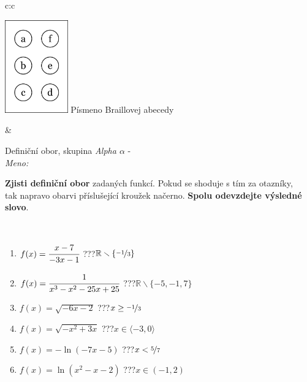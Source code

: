 \documentclass[10pt]{report}
\begin{document}
\begin{tabular}{c:c}
\begin{minipage}[c][104.5mm][t]{0.5\linewidth}
\begin{center}
\begin{minipage}{0.20\linewidth}
\begin{center}
\includegraphics[height=40mm]{../images/braille.png}
{\small Písmeno Braillovej abecedy}
\end{center}
\end{minipage}
\end{center}
\end{minipage}
&
\begin{minipage}[c][104.5mm][t]{0.5\linewidth}
\begin{center}
\vspace{7mm}
{\huge Definiční obor, skupina \textit{Alpha $\alpha$} -}\\[5mm]
\textit{Meno:}\phantom{xxxxxxxxxxxxxxxxxxxxxxxxxxxxxxxxxxxxxxxxxxxxxxxxxxxxxxxxxxxxxxxxx}\\[5mm]
\begin{minipage}{0.95\linewidth}
\textbf{Zjisti definiční obor} zadaných funkcí. Pokud se shoduje s tím za otazníky,\\tak napravo obarvi příslušející kroužek načerno. \textbf{Spolu odevzdejte výsledné slovo}.
\end{minipage}
\\[1mm]
\begin{minipage}{0.79\linewidth}
\begin{center}
\begin{varwidth}{\linewidth}
\begin{enumerate}
\normalsizerrr
\item $f(x)=\cfrac{x-7}{-3x-1}$\quad \dotfill\; ???\;\dotfill \quad $\mathbb{R}\smallsetminus\{\nicefrac{-1}{3}\}$
\item $f(x)=\cfrac{1}{x^3-x^2-25x+25}$\quad \dotfill\; ???\;\dotfill \quad $\mathbb{R}\smallsetminus\{-5,-1,7\}$
\item $f(x)=\sqrt{-6x-2}$\quad \dotfill\; ???\;\dotfill \quad $x\geq\nicefrac{-1}{3}$
\item $f(x)=\sqrt{-x^2+3x}$\quad \dotfill\; ???\;\dotfill \quad $x\in\langle-3 , 0\rangle$
\item $f(x)=-\ln{(-7x-5)}$\quad \dotfill\; ???\;\dotfill \quad $x<\nicefrac{5}{7}$
\item $f(x)=\ln{(x^2-x-2)}$\quad \dotfill\; ???\;\dotfill \quad $x\in(-1 , 2)$

\end{enumerate}
\end{varwidth}
\end{center}
\end{minipage}
\end{center}
\end{minipage}
\end{tabular}
\end{document}
